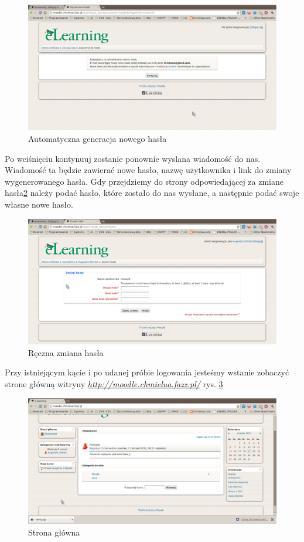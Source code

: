 \begin{figure}[!h]
	\centering
		\caption{Automatyczna generacja nowego hasła} \label{rys:new_pass}
		\includegraphics[width=1\textwidth]{projekt_sys//rys//nowe_haslo.eps}
\end{figure}
Po wciśnięciu kontynuuj zostanie ponownie wyslana wiadomość do nas. Wiadomość ta będzie zawierać nowe hasło, nazwę użytkownika i link do zmiany wygenerowanego hasła. Gdy przejdziemy do strony odpowiedającej za zmiane hasła\ref{rys:zmien_haslo} należy podać hasło, które zostało do nas wysłane, a następnie podać swoje własne nowe hasło. 
\begin{figure}[!h]
	\centering
		\caption{Ręczna zmiana hasła} \label{rys:zmien_haslo}
		\includegraphics[width=1\textwidth]{projekt_sys//rys//zmiana_hasla.eps}
\end{figure}
Przy istniejącym kącie i po udanej próbie logowania jesteśmy wstanie zobaczyć strone główną witryny \href{http://moodle.chmielua.fazz.pl/}{\textit{http://moodle.chmielua.fazz.pl/}} rys. \ref{rys:glowna}
\begin{figure}[!h]
	\centering
		\caption{Strona główna} \label{rys:glowna}
		\includegraphics[width=1\textwidth]{projekt_sys//rys//glowna.eps}
\end{figure}
